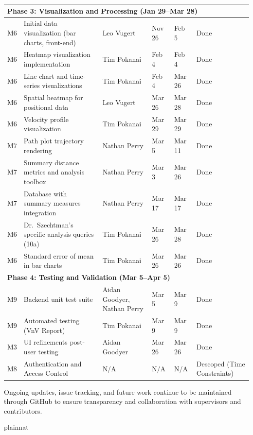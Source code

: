 \documentclass[12pt, titlepage]{article}
\begin{document}
\begin{longtable}{|p{1.2cm}|p{4.5cm}|p{3cm}|p{2cm}|p{2cm}|p{1.5cm}|}
\multicolumn{6}{|l|}{\textbf{Phase 3: Visualization and Processing (Jan 29--Mar 28)}} \\ \hline
M6 & Initial data visualization (bar charts, front-end) & Leo Vugert & Nov 26 & Feb 5 & Done \\ \hline
M6 & Heatmap visualization implementation & Tim Pokanai & Feb 4 & Feb 4 & Done \\ \hline
M6 & Line chart and time-series visualizations & Tim Pokanai & Feb 4 & Mar 26 & Done \\ \hline
M6 & Spatial heatmap for positional data & Leo Vugert & Mar 26 & Mar 28 & Done \\ \hline
M6 & Velocity profile visualization & Tim Pokanai & Mar 29 & Mar 29 & Done \\ \hline
M7 & Path plot trajectory rendering & Nathan Perry & Mar 5 & Mar 11 & Done \\ \hline
M7 & Summary distance metrics and analysis toolbox & Nathan Perry & Mar 3 & Mar 26 & Done \\ \hline
M7 & Database with summary measures integration & Nathan Perry & Mar 17 & Mar 17 & Done \\ \hline
M6 & Dr.~Szechtman's specific analysis queries (10a) & Tim Pokanai & Mar 26 & Mar 28 & Done \\ \hline
M6 & Standard error of mean in bar charts & Tim Pokanai & Mar 26 & Mar 26 & Done \\ \hline

\multicolumn{6}{|l|}{\textbf{Phase 4: Testing and Validation (Mar 5--Apr 5)}} \\ \hline
M9 & Backend unit test suite & Aidan Goodyer, Nathan Perry & Mar 5 & Mar 9 & Done \\ \hline
M9 & Automated testing (VnV Report) & Tim Pokanai & Mar 9 & Mar 9 & Done \\ \hline
M3 & UI refinements post-user testing & Aidan Goodyer & Mar 26 & Mar 26 & Done \\ \hline
M8 & Authentication and Access Control & N/A & N/A & N/A & Descoped (Time Constraints) \\ \hline

\end{longtable}

Ongoing updates, issue tracking, and future work continue to be maintained through
GitHub to ensure transparency and collaboration with supervisors and contributors.

 {plainnat}


\newpage{}
\end{document}
